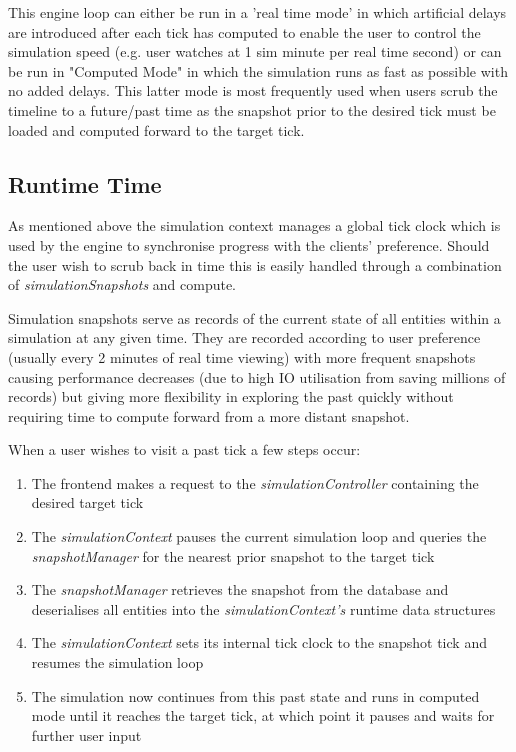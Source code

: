 This engine loop can either be run in a 'real time mode' in which artificial delays are introduced after each tick has computed to enable the user to control the simulation speed (e.g. user watches at 1 sim minute per real time second) or can be run in "Computed Mode" in which the simulation runs as fast as possible with no added delays. This latter mode is most frequently used when users scrub the timeline to a future/past time as the snapshot prior to the desired tick must be loaded and computed forward to the target tick.

\subsection{Runtime Time}
As mentioned above the simulation context manages a global tick clock which is used by the engine to synchronise progress with the clients' preference. Should the user wish to scrub back in time this is easily handled through a combination of \textit{simulationSnapshots} and compute. 

Simulation snapshots serve as records of the current state of all entities within a simulation at any given time. They are recorded according to user preference (usually every 2 minutes of real time viewing) with more frequent snapshots causing performance decreases (due to high IO utilisation from saving millions of records) but giving more flexibility in exploring the past quickly without requiring time to compute forward from a more distant snapshot.

When a user wishes to visit a past tick a few steps occur:
\begin{enumerate}
    \item The frontend makes a request to the \textit{simulationController} containing the desired target tick
    \item The \textit{simulationContext} pauses the current simulation loop and queries the \textit{snapshotManager} for the nearest prior snapshot to the target tick
    \item The \textit{snapshotManager} retrieves the snapshot from the database and deserialises all entities into the \textit{simulationContext's} runtime data structures
    \item The \textit{simulationContext} sets its internal tick clock to the snapshot tick and resumes the simulation loop
    \item The simulation now continues from this past state and runs in computed mode until it reaches the target tick, at which point it pauses and waits for further user input
\end{enumerate}

